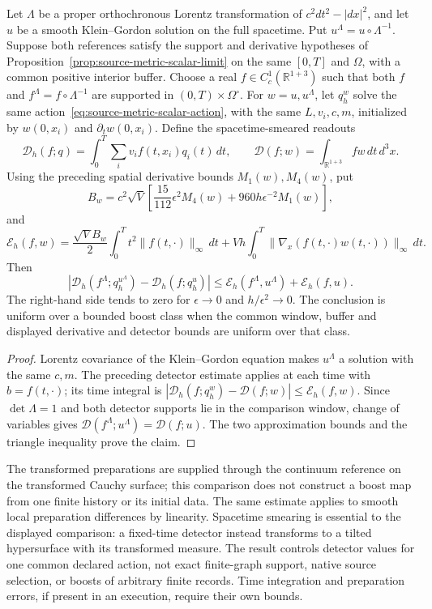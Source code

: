 \begin{proposition}
\label{prop:source-metric-boost-detectors}
Let $\Lambda$ be a proper orthochronous Lorentz transformation of
$c^2dt^2-|dx|^2$, and let $u$ be a smooth Klein--Gordon solution on the
full spacetime. Put $u^\Lambda=u\circ\Lambda^{-1}$. Suppose both
references satisfy the support and derivative hypotheses of
Proposition~\ref{prop:source-metric-scalar-limit} on the same $[0,T]$
and $\Omega$, with a common positive interior buffer. Choose a real
$f\in C_c^1(\mathbb R^{1+3})$ such that both $f$ and
$f^\Lambda=f\circ\Lambda^{-1}$ are supported in
$(0,T)\times\Omega^\circ$. For $w=u,u^\Lambda$, let $q_h^w$ solve
the same action~\eqref{eq:source-metric-scalar-action}, with the same
$L,v_i,c,m$, initialized by $w(0,x_i)$ and $\partial_tw(0,x_i)$.
Define the spacetime-smeared readouts
\[
 \mathcal D_h(f;q)=\int_0^T\sum_i v_i f(t,x_i)q_i(t)\,dt,
 \qquad
 \mathcal D(f;w)=\int_{\mathbb R^{1+3}}fw\,dt\,d^3x.
\]
Using the preceding spatial derivative bounds $M_1(w),M_4(w)$, put
\[
 B_w=c^2\sqrt V\left[
   \frac{15}{112}\epsilon^2M_4(w)
   +960h\epsilon^{-2}M_1(w)\right],
\]
and
\[
 \mathcal E_h(f,w)=
 \frac{\sqrt V B_w}{2}\int_0^T t^2\|f(t,\cdot)\|_\infty\,dt
 +Vh\int_0^T
       \|\nabla_x(f(t,\cdot)w(t,\cdot))\|_\infty\,dt.
\]
Then
\begin{equation}
 \left|\mathcal D_h(f^\Lambda;q_h^{u^\Lambda})
          -\mathcal D_h(f;q_h^u)\right|
 \le \mathcal E_h(f^\Lambda,u^\Lambda)+\mathcal E_h(f,u).
 \label{eq:source-metric-boost-detector-error}
\end{equation}
The right-hand side tends to zero for $\epsilon\to0$ and
$h/\epsilon^2\to0$. The conclusion is uniform over a bounded boost
class when the common window, buffer and displayed derivative and detector
bounds are uniform over that class.
\end{proposition}
\begin{proof}
Lorentz covariance of the Klein--Gordon equation makes $u^\Lambda$ a
solution with the same $c,m$. The preceding detector estimate applies at
each time with $b=f(t,\cdot)$; its time integral is
$|\mathcal D_h(f;q_h^w)-\mathcal D(f;w)|\le\mathcal E_h(f,w)$.
Since $\det\Lambda=1$ and both detector supports lie in the comparison
window, change of variables gives
$\mathcal D(f^\Lambda;u^\Lambda)=\mathcal D(f;u)$.
The two approximation bounds and the triangle inequality prove the claim.
\end{proof}

The transformed preparations are supplied through the continuum reference
on the transformed Cauchy surface; this comparison does not construct a
boost map from one finite history or its initial data. The same estimate
applies to smooth local preparation differences by linearity. Spacetime
smearing is essential to the displayed comparison: a fixed-time detector
instead transforms to a tilted hypersurface with its transformed measure.
The result controls detector values for one common declared action, not
exact finite-graph support, native source selection, or boosts of arbitrary
finite records. Time integration and preparation errors, if present in an
execution, require their own bounds.
